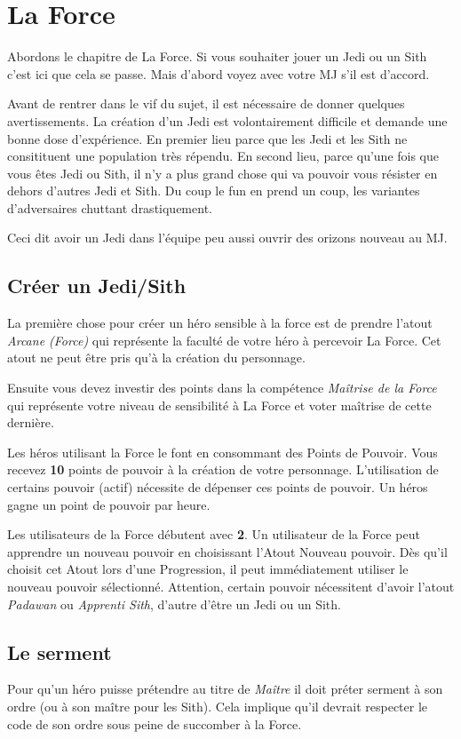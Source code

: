 \section{La Force}
\label{sec:force}

Abordons le chapitre de La Force. Si vous souhaiter jouer un Jedi ou un Sith c’est ici que cela se passe. Mais d’abord voyez avec votre MJ s’il est d’accord.

Avant de rentrer dans le vif du sujet, il est nécessaire de donner quelques avertissements. La création d’un Jedi est volontairement difficile et demande une bonne dose d’expérience. En premier lieu parce que les Jedi et les Sith ne consitituent une population très répendu. En second lieu, parce qu’une fois que vous êtes Jedi ou Sith, il n’y a plus grand chose qui va pouvoir vous résister en dehors d’autres Jedi et Sith. Du coup le fun en prend un coup, les variantes d’adversaires chuttant drastiquement.

Ceci dit avoir un Jedi dans l’équipe peu aussi ouvrir des orizons nouveau au MJ.

\subsection{Créer un Jedi/Sith}
La première chose pour créer un héro sensible à la force est de prendre l’atout \emph{Arcane (Force)} qui représente la faculté de votre héro à percevoir La Force. Cet atout ne peut être pris qu'à la création du personnage.

Ensuite vous devez investir des points dans la compétence \emph{Maîtrise de la Force} qui représente votre niveau de sensibilité à La Force et voter maîtrise de cette dernière.

Les héros utilisant la Force le font en consommant des Points de Pouvoir. Vous recevez \textbf{10} points de pouvoir à la création de votre personnage. L’utilisation de certains pouvoir (actif) nécessite de dépenser ces points de pouvoir. Un héros gagne un point de pouvoir par heure.

Les utilisateurs de la Force débutent avec \textbf{2}. Un utilisateur de la Force peut apprendre un nouveau pouvoir en choisissant l’Atout Nouveau pouvoir. Dès qu’il choisit cet Atout lors d’une Progression, il peut immédiatement utiliser le nouveau pouvoir sélectionné. Attention, certain pouvoir nécessitent d'avoir l'atout \emph{Padawan} ou \emph{Apprenti Sith}, d'autre d'être un Jedi ou un Sith.

\subsection{Le serment}
\label{sec:force-serment}
Pour qu'un héro puisse prétendre au titre de \emph{Maître} il doit préter serment à son ordre (ou à son maître pour les Sith). Cela implique qu'il devrait respecter le code de son ordre sous peine de succomber à la Force.

